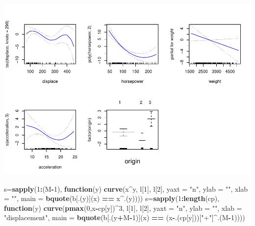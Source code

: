 \documentclass[]{article}
\newenvironment{Shaded}{\begin{snugshade}}{\end{snugshade}}
\newcommand{\KeywordTok}[1]{\textcolor[rgb]{0.13,0.29,0.53}{\textbf{#1}}}
\newcommand{\DataTypeTok}[1]{\textcolor[rgb]{0.13,0.29,0.53}{#1}}
\newcommand{\DecValTok}[1]{\textcolor[rgb]{0.00,0.00,0.81}{#1}}
\newcommand{\StringTok}[1]{\textcolor[rgb]{0.31,0.60,0.02}{#1}}
\newcommand{\ControlFlowTok}[1]{\textcolor[rgb]{0.13,0.29,0.53}{\textbf{#1}}}
\newcommand{\OperatorTok}[1]{\textcolor[rgb]{0.81,0.36,0.00}{\textbf{#1}}}
\newcommand{\NormalTok}[1]{#1}
\begin{document}
\includegraphics{Project2_files/figure-latex/unnamed-chunk-9-1.pdf}

\begin{Shaded}
\begin{Highlighting}[]
\NormalTok{s=}\KeywordTok{sapply}\NormalTok{(}\DecValTok{1}\OperatorTok{:}\NormalTok{(M}\OperatorTok{-}\DecValTok{1}\NormalTok{), }\ControlFlowTok{function}\NormalTok{(y) }\KeywordTok{curve}\NormalTok{(x}\OperatorTok{^}\NormalTok{y, l[}\DecValTok{1}\NormalTok{], l[}\DecValTok{2}\NormalTok{], }\DataTypeTok{yaxt =} \StringTok{"n"}\NormalTok{,}
 \DataTypeTok{ylab =} \StringTok{""}\NormalTok{, }\DataTypeTok{xlab =} \StringTok{""}\NormalTok{, }\DataTypeTok{main =} \KeywordTok{bquote}\NormalTok{(b[.(y)](x) }\OperatorTok{==}\StringTok{ }\NormalTok{x}\OperatorTok{^}\NormalTok{.(y))))}
\NormalTok{s=}\KeywordTok{sapply}\NormalTok{(}\DecValTok{1}\OperatorTok{:}\KeywordTok{length}\NormalTok{(cp), }\ControlFlowTok{function}\NormalTok{(y) }\KeywordTok{curve}\NormalTok{(}\KeywordTok{pmax}\NormalTok{(}\DecValTok{0}\NormalTok{,x}\OperatorTok{-}\NormalTok{cp[y])}\OperatorTok{^}\DecValTok{3}\NormalTok{, l[}\DecValTok{1}\NormalTok{], l[}\DecValTok{2}\NormalTok{], }\DataTypeTok{yaxt =} \StringTok{"n"}\NormalTok{,}
 \DataTypeTok{ylab =} \StringTok{""}\NormalTok{, }\DataTypeTok{xlab =} \StringTok{"displacement"}\NormalTok{, }\DataTypeTok{main =} \KeywordTok{bquote}\NormalTok{(b[.(y}\OperatorTok{+}\NormalTok{M}\OperatorTok{-}\DecValTok{1}\NormalTok{)](x) }\OperatorTok{==}\StringTok{ }\NormalTok{(x}\OperatorTok{-}\NormalTok{.(cp[y]))[}\StringTok{"+"}\NormalTok{]}\OperatorTok{^}\NormalTok{.(M}\OperatorTok{-}\DecValTok{1}\NormalTok{))))}
\end{Highlighting}
\end{Shaded}
\end{document}
